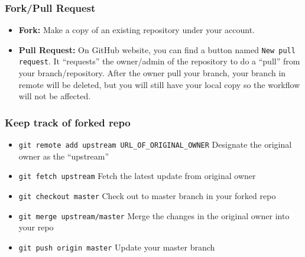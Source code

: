 \documentclass{beamer}
\begin{document}
			\begin{frame}
				\frametitle{Fork/Pull Request}
				\begin{itemize}
					\item \textbf{Fork:} Make a copy of an existing repository under your account. 
					\item \textbf{Pull Request: }On GitHub website, you can find a button named \texttt{New pull request}. It ``requests'' the owner/admin of the repository to do a ``pull'' from your branch/repository. After the owner pull your branch, your branch in remote will be deleted, but you will still have your local copy so the workflow will not be affected.
				\end{itemize}				
			\end{frame}

			\begin{frame}
				\frametitle{Keep track of forked repo}
				\begin{itemize}
					\item \texttt{git remote add upstream URL\_OF\_ORIGINAL\_OWNER} Designate the original owner as the ``upstream''
					\item \texttt{git fetch upstream} Fetch the latest update from original owner
					\item \texttt{git checkout master} Check out to master branch in your forked repo
					\item \texttt{git merge upstream/master} Merge the changes in the original owner into your repo
					\item \texttt{git push origin master} Update your master branch
				\end{itemize}					
			\end{frame}
\end{document}
